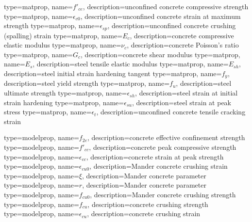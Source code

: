 {
    type=matprop,
    name=$f'_{ce}$,
    description={unconfined concrete compressive strength}
}
{
    type=matprop,
    name=$\epsilon_{c0}$,
    description={unconfined concrete strain at maximum strength}
}
{
    type=matprop,
    name=$\epsilon_{sp}$,
    description={unconfined concrete crushing (spalling) strain}
}
{
    type=matprop,
    name=$E_{c}$,
    description={concrete compressive elastic modulus}
}
{
    type=matprop,
    name=$\nu_{c}$,
    description={concrete Poisson's ratio}
}
{
    type=matprop,
    name=$G_{c}$,
    description={concrete shear modulus}
}
{
    type=matprop,
    name=$E_{s}$,
    description={steel tensile elastic modulus}
}
{
    type=matprop,
    name=$E_{sh}$,
    description={steel initial strain hardening tangent}
}
{
    type=matprop,
    name=$f_{y}$,
    description={steel yield strength}
}
{
    type=matprop,
    name=$f_{u}$,
    description={steel ultimate strength}
}
{
    type=matprop,
    name=$\epsilon_{sh}$,
    description={steel strain at initial strain hardening}
}
{
    type=matprop,
    name=$\epsilon_{su}$,
    description={steel strain at peak stress}
}
{
    type=matprop,
    name=$\epsilon_{t}$,
    description={unconfined concrete tensile cracking strain}
}

{
    type=modelprop,
    name=$f_{2e}$,
    description={concrete effective confinement strength}
}
{
    type=modelprop,
    name=$f'_{cc}$,
    description={concrete peak compressive strength}
}
{
    type=modelprop,
    name=$\epsilon_{cc}$,
    description={concrete strain at peak strength}
}
{
    type=modelprop,
    name=$\epsilon_{cu0}$,
    description={Mander concrete crushing strain}
}
{
    type=modelprop,
    name=$\xi$,
    description={Mander concrete parameter}
}
{
    type=modelprop,
    name=$r$,
    description={Mander concrete parameter}
}
{
    type=modelprop,
    name=$f_{cu0}$,
    description={Mander concrete crushing strength}
}
{
    type=modelprop,
    name=$f_{cu}$,
    description={concrete crushing strength}
}
{
    type=modelprop,
    name=$\epsilon_{cu}$,
    description={concrete crushing strain}
}